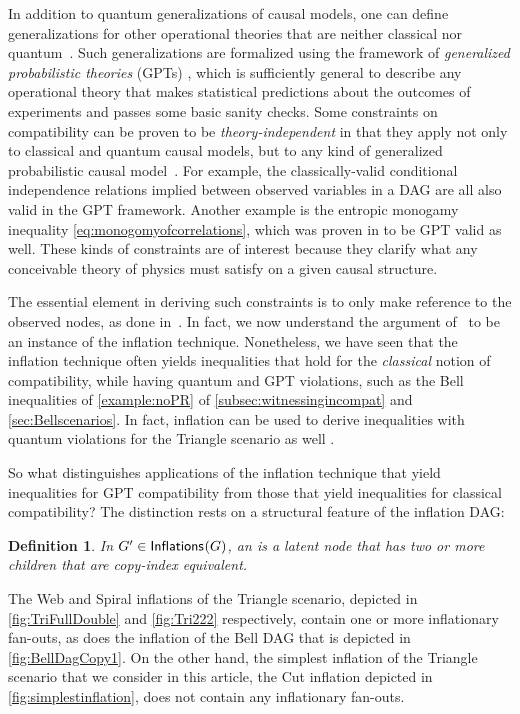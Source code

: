 \documentclass[aps,english,superscriptaddress,onecolumn,twoside,longbibliography,pra,floatfix,fleqn,nofootinbib]{revtex4-1}%
\newcommand*{\tblue}[1]{{\color{MidnightBlue}{\textbf{#1}}}}
\newtheorem{definition}[theorem]{Definition}
\theoremstyle{definition}
\newcounter{example}[section]
\newcommand{\SmallNamedFunction}[3][]{\operatorname{\mathsf{#2}}_{#1}\parenths{#3}}
\newcommand{\inflations}[1]{\SmallNamedFunction{Inflations}{#1}}
\DeclarePairedDelimiter{\parenths}{\lparen}{\rparen}
\begin{document}
In addition to quantum generalizations of causal models, one can define generalizations for other operational theories that are neither classical nor quantum~\cite{pusey2014gdag,BeyondBellII}.
Such generalizations are formalized using the framework of {\em generalized probabilistic theories} (GPTs) \cite{Barnum2012GPT,Janotta2014GPT}, which is sufficiently general to describe any operational theory that makes statistical predictions about the outcomes of experiments and passes some basic sanity checks.  Some constraints on compatibility can be proven to be \emph{theory-independent} in that they apply not only to classical and quantum causal models, but to any kind of generalized probabilistic causal model~\cite{pusey2014gdag}. For example, the classically-valid conditional independence relations implied between observed variables in a DAG are all also valid in the GPT framework.
Another example is the entropic monogamy inequality \cref{eq:monogomyofcorrelations}, which was proven in \cite{pusey2014gdag} to be GPT valid as well. These kinds of constraints are of interest because they clarify what any conceivable theory of physics must satisfy on a given causal structure. 

The essential element in deriving such constraints is to only make reference to the observed nodes, as done in~\cite{pusey2014gdag}. In fact, we now understand the argument of~\cite{pusey2014gdag} to be an instance of the inflation technique. Nonetheless, we have seen that the inflation technique often yields inequalities that hold for the {\em classical} notion of compatibility, while having quantum and GPT violations, such as the Bell inequalities of \cref{example:noPR} of \cref{subsec:witnessingincompat} and \cref{sec:Bellscenarios}. In fact, inflation can be used to derive inequalities with quantum violations for the Triangle scenario as well \cite{TC2016trianglequantum}.

So what distinguishes applications of the inflation technique that yield inequalities for GPT compatibility from those that yield inequalities for classical compatibility?   The distinction rests on a structural feature of the inflation DAG:




\begin{definition}
In $G'\in\inflations{G}$, an \tblue{inflationary fan-out} is a latent node that has two or more children that are copy-index equivalent.  
\end{definition}

 The Web and Spiral inflations of the Triangle scenario, depicted in \cref{fig:TriFullDouble} and \cref{fig:Tri222} respectively,
contain one or more inflationary fan-outs, as does the inflation of the Bell DAG that is depicted in \cref{fig:BellDagCopy1}.  On the other hand, the simplest inflation of the Triangle scenario that we consider in this article, the Cut inflation depicted in \cref{fig:simplestinflation}, does not contain any inflationary fan-outs.
\end{document}
